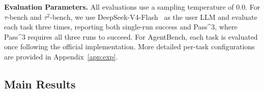 \noindent \textbf{Evaluation Parameters.}
All evaluations use a sampling temperature of \(0.0\). For \(\tau\)-bench and
\(\tau^2\)-bench, we use DeepSeek-V4-Flash~\cite{deepseekai2026deepseekv4} as the user LLM and evaluate
each task three times, reporting both single-run success and Pass\textasciicircum{}3, where
Pass\textasciicircum{}3 requires all three runs to succeed. For AgentBench, each task is
evaluated once following the official implementation. More detailed per-task configurations are provided in
Appendix~\ref{app:exp}.
\subsection{Main Results}
\begin{table}[t]
    \centering
    \huge
    \setlength{\tabcolsep}{4pt}
    \caption{
    Main results averaged over 18 model backbones.
    }
    \label{tab:exp_main}
\end{table}
